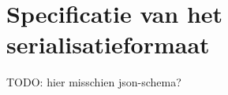 \chapter{Specificatie van het serialisatieformaat}\label{ch:specificatie-van-het-serialisatieformaat}

TODO: hier misschien json-schema?
